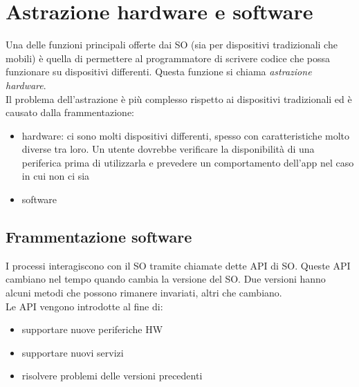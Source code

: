 \section{Astrazione hardware e software}
Una delle funzioni principali offerte dai SO (sia per dispositivi tradizionali che mobili) è quella di permettere al programmatore di scrivere codice che possa funzionare su dispositivi differenti. Questa funzione si chiama \textit{astrazione hardware}.
\\ Il problema dell'astrazione è più complesso rispetto ai dispositivi tradizionali ed è causato dalla frammentazione:
\begin{itemize}
    \item hardware: ci sono molti dispositivi differenti, spesso con caratteristiche molto diverse tra loro. Un utente dovrebbe verificare la disponibilità di una periferica prima di utilizzarla e prevedere un comportamento dell'app nel caso in cui non ci sia
    \item software
\end{itemize}

\subsection{Frammentazione software}
I processi interagiscono con il SO tramite chiamate dette API di SO. Queste API cambiano nel tempo quando cambia la versione del SO. Due versioni hanno alcuni metodi che possono rimanere invariati, altri che cambiano.
\\ Le API vengono introdotte al fine di: 
\begin{itemize}
    \item supportare nuove periferiche HW
    \item supportare nuovi servizi
    \item risolvere problemi delle versioni precedenti
\end{itemize}

